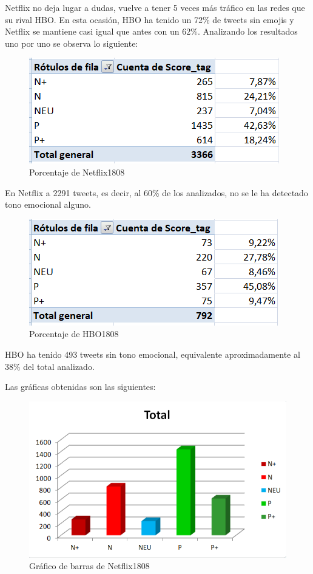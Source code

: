 Netflix no deja lugar a dudas, vuelve a tener 5 veces más tráfico en las redes que su rival HBO. 
En esta ocasión, HBO ha tenido un 72\% de tweets sin emojis y Netflix se mantiene casi igual que antes con un 62\%. Analizando los resultados uno por uno se observa lo siguiente: 

\begin{figure}[H]
	\centering
	\includegraphics[scale=1]{imagenes/porcentajeNetflix1808.PNG}
	\caption{Porcentaje de Netflix1808}
	\label{fig:porcentaje-Netflix1808}
\end{figure}

En Netflix a 2291 tweets, es decir, al 60\% de los analizados, no se le ha detectado tono emocional alguno. 

\begin{figure}[H]
	\centering
	\includegraphics[scale=1]{imagenes/porcentajeHBO1808.PNG}
	\caption{Porcentaje de HBO1808}
	\label{fig:porcentaje-HBO1808}
\end{figure}

HBO ha tenido 493 tweets sin tono emocional, equivalente aproximadamente al 38\% del total analizado. 


Las gráficas obtenidas son las siguientes: 

\begin{figure}[H]
	\centering
	\includegraphics[scale=1]{imagenes/barrasNetflix1808.PNG}
	\caption{Gráfico de barras de Netflix1808}
	\label{fig:barrasNetflix1808}
\end{figure}



